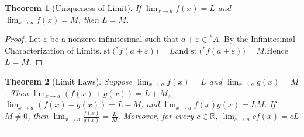 \documentclass[10pt,a4paper]{book}
\newtheorem{theorem}{Theorem}[section]
\begin{document}
\begin{theorem}[Uniqueness of Limit]

    If $\lim_{x\to a}f(x)=L$ and $\lim_{x\to a}f(x)=M$, then $L=M$.

\end{theorem}

\begin{proof}

    Let $\varepsilon$ be a nonzero infinitesimal such that $a+\varepsilon\in{}^*A$.
    By the Infinitesimal Characterization of Limits,$
        \operatorname{st}\bigl({}^*f(a+\varepsilon)\bigr)=L $and$
        \operatorname{st}\bigl({}^*f(a+\varepsilon)\bigr)=M. $Hence$ L=M. $

\end{proof}

\begin{theorem}[Limit Laws]

    Suppose $\lim_{x\to a}f(x)=L$ and $\lim_{x\to a}g(x)=M$. Then $\lim_{x\to
            a}(f(x)+g(x))=L+M$, $\lim_{x\to a}(f(x)-g(x))=L-M$, and $\lim_{x\to
            a}f(x)g(x)=LM$. If $M\neq0$, then $\lim_{x\to a}\frac{f(x)}{g(x)}=\frac{L}{M}$.
    Moreover, for every $c\in\mathbb{R}$, $\lim_{x\to a}cf(x)=cL$.

\end{theorem}
\end{document}
